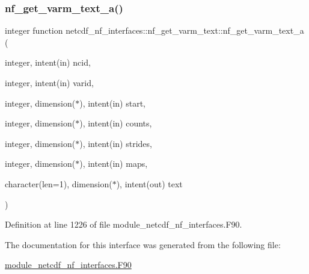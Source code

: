 \subsubsection{\texorpdfstring{nf\+\_\+get\+\_\+varm\+\_\+text\+\_\+a()}{nf\_get\_varm\_text\_a()}}
{\footnotesize\ttfamily integer function netcdf\+\_\+nf\+\_\+interfaces\+::nf\+\_\+get\+\_\+varm\+\_\+text\+::nf\+\_\+get\+\_\+varm\+\_\+text\+\_\+a (\begin{DoxyParamCaption}\item[{integer, intent(in)}]{ncid,  }\item[{integer, intent(in)}]{varid,  }\item[{integer, dimension($\ast$), intent(in)}]{start,  }\item[{integer, dimension($\ast$), intent(in)}]{counts,  }\item[{integer, dimension($\ast$), intent(in)}]{strides,  }\item[{integer, dimension($\ast$), intent(in)}]{maps,  }\item[{character(len=1), dimension($\ast$), intent(out)}]{text }\end{DoxyParamCaption})}



Definition at line 1226 of file module\+\_\+netcdf\+\_\+nf\+\_\+interfaces.\+F90.



The documentation for this interface was generated from the following file\+:\begin{DoxyCompactItemize}
\item 
\hyperlink{module__netcdf__nf__interfaces_8F90}{module\+\_\+netcdf\+\_\+nf\+\_\+interfaces.\+F90}\end{DoxyCompactItemize}
